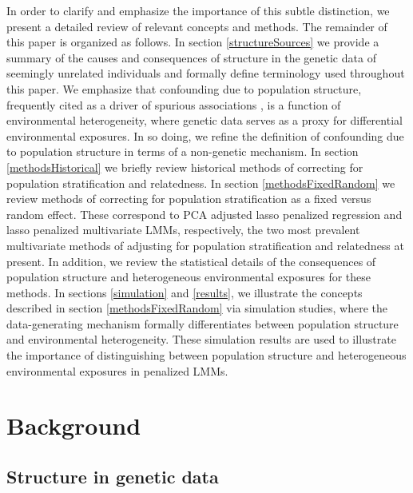 In order to clarify and emphasize the importance of this subtle distinction, we present a detailed review of relevant concepts and methods. The remainder of this paper is organized as follows. In section \ref{structureSources} we provide a summary of the causes and consequences of structure in the genetic data of seemingly unrelated individuals and formally define terminology used throughout this paper. We emphasize that confounding due to population structure, frequently cited as a driver of spurious associations \cite{Sillanpaeae2011, sul2018population} , is a function of environmental heterogeneity, where genetic data serves as a proxy for differential environmental exposures. In so doing, we refine the definition of confounding due to population structure in terms of a non-genetic mechanism. In section \ref{methodsHistorical} we briefly review historical methods of correcting for population stratification and relatedness. In section \ref{methodsFixedRandom} we review methods of correcting for population stratification as a fixed versus random effect. These correspond to PCA adjusted lasso penalized regression and lasso penalized multivariate LMMs, respectively, the two most prevalent multivariate methods of adjusting for population stratification and relatedness at present. In addition, we review the statistical details of the consequences of population structure and heterogeneous environmental exposures for these methods. In sections \ref{simulation} and \ref{results}, we illustrate the concepts described in section \ref{methodsFixedRandom} via simulation studies, where the data-generating mechanism formally differentiates between population structure and environmental heterogeneity. These simulation results are used to illustrate the importance of distinguishing between population structure and heterogeneous environmental exposures in penalized LMMs.





\section{Background}

\subsection{Structure in genetic data}

